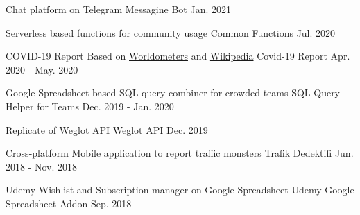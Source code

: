 

\begin{cventries}

  \cventry
    {Chat platform on Telegram} %
    {Messagine Bot} %
    {} %
    {Jan. 2021} %
    {}

  \cventry
    {Serverless based functions for community usage} %
    {Common Functions} %
    {} %
    {Jul. 2020} %
    {}

  \cventry
    {COVID-19 Report Based on \href{https://www.worldometers.info/coronavirus}{Worldometers} and \href{https://en.wikipedia.org/wiki/COVID-19_pandemic}{Wikipedia}} %
    {Covid-19 Report} %
    {} %
    {Apr. 2020 - May. 2020} %
    {}

  \cventry
    {Google Spreadsheet based SQL query combiner for crowded teams} %
    {SQL Query Helper for Teams} %
    {} %
    {Dec. 2019 - Jan. 2020} %
    {}

  \cventry
    {Replicate of Weglot API} %
    {Weglot API} %
    {} %
    {Dec. 2019} %
    {}

  \cventry
    {Cross-platform Mobile application to report traffic monsters} %
    {Trafik Dedektifi} %
    {} %
    {Jun. 2018 - Nov. 2018} %
    {}

  \cventry
    {Udemy Wishlist and Subscription manager on Google Spreadsheet} %
    {Udemy Google Spreadsheet Addon} %
    {} %
    {Sep. 2018} %
    {}


\end{cventries}
